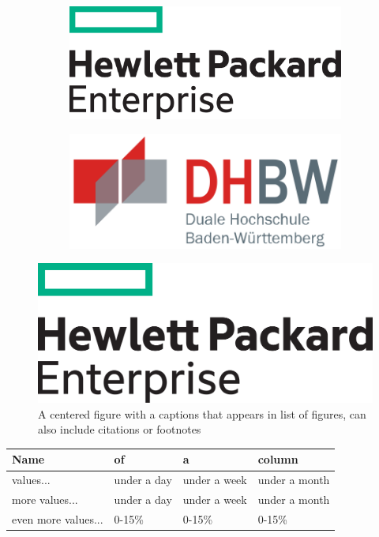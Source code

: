 \begin{figure}[h!]
	\begin{subfigure}{0.5\textwidth}
		\raggedright
		\includegraphics[width = 0.8\linewidth, keepaspectratio]{./Images/HPE-Logo}
	\end{subfigure}
	\begin{subfigure}{0.5\textwidth}
		\raggedleft
		\includegraphics[width = 0.8\linewidth, keepaspectratio]{./Images/DHBW-Logo}
	\end{subfigure}
\end{figure}
%
\begin{figure}[h!]
	\centering %
	\includegraphics[width=0.4\linewidth]{./Images/HPE-Logo}
	\caption{A centered figure with a captions that appears in list of figures, can also include citations or footnotes \cite{Mustermann2020}}
\end{figure}
%
\begin{center} %
	\footnotesize %
	\begin{tabular}{|p{}|p{}|p{}|p{}|}
		\hline %
		Name & of & a & column \\ \hline
		values... & under a day & under a week & under a month \\ \hline
		more values... & under a day & under a week & under a month \\ \hline
		even more values... & 0-15\% & 0-15\% & 0-15\% \\ \hline
	\end{tabular}
\end{center}
